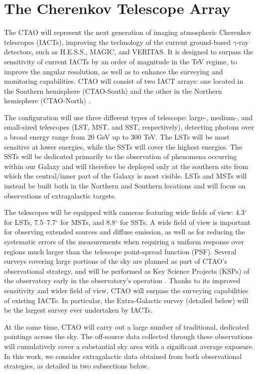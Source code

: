 \section{The Cherenkov Telescope Array}\label{sec:CTA}
The CTAO will represent the next generation of imaging atmospheric Cherenkov telescopes (IACTs), improving the technology of the current ground-based $\gamma$-ray detectors, such as H.E.S.S., MAGIC, and VERITAS. It is designed to surpass the sensitivity of current IACTs by an order of magnitude in the TeV regime, to improve the angular resolution, as well as to enhance the surveying and monitoring capabilities. CTAO  will consist of two IACT arrays: one located in the Southern hemisphere (CTAO-South) and the other in the Northern hemisphere (CTAO-North) \cite{CTAConsortium:2018tzg}.

The configuration will use three different types of telescope: large-, medium-, and small-sized telescopes (LST, MST, and SST, respectively), detecting photons over a broad energy range from 20 GeV up to 300 TeV. The LSTs will be most sensitive at lower energies, while the SSTs will cover the highest energies. The SSTs will be {dedicated primarily to the observation of}  phenomena occurring within our Galaxy and will {therefore be deployed only at the southern site from which} the central/inner part of the Galaxy is most visible. LSTs and MSTs will instead be built both in the Northern and Southern locations and will focus on observations of extragalactic targets.

The telescopes will be equipped with cameras featuring wide fields of view: 
{4.3$^\circ$} for LSTs, {7.5--7.7$^\circ$} for MSTs, and {8.8$^\circ$} for SSTs. A wide field of view is important for observing extended sources and diffuse emission, as well as for reducing the systematic errors of the measurements when requiring a uniform response over regions much larger than the telescope point-spread function (PSF). Several surveys covering large portions of the sky are planned as part of CTAO's observational strategy, and will be performed as Key Science Projects (KSPs) of the observatory early in the observatory's operation 
\cite{CTAConsortium:2018tzg}. Thanks to its improved sensitivity and wider field of view, {CTAO will surpass} the surveying capabilities of existing IACTs. In particular, the Extra-Galactic survey (detailed below) { will be} the largest survey ever undertaken by IACTs.   

At the same time, CTAO will carry out a large number of traditional, dedicated pointings across the sky. The off-source data collected through these observations will cumulatively cover a substantial sky area with a significant average exposure. In this work, we consider extragalactic data obtained from both observational strategies, as detailed in two subsections below.

